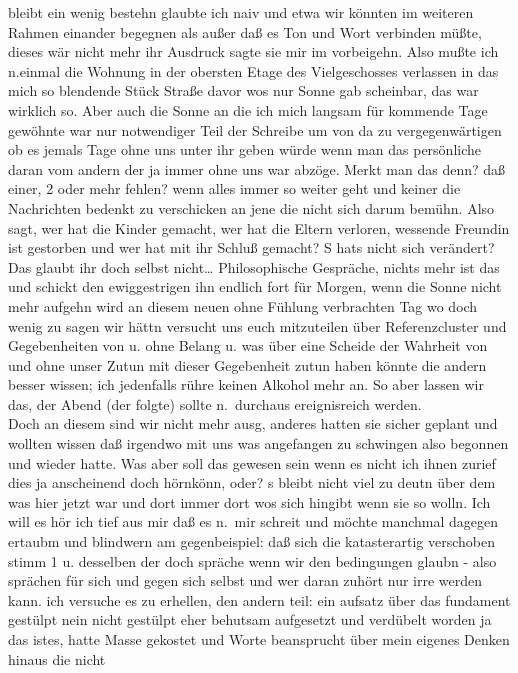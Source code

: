 \documentclass[
]{article}
\begin{document}
bleibt ein wenig bestehn glaubte ich naiv und etwa wir könnten im
weiteren Rahmen einander begegnen als außer daß es Ton und Wort
verbinden müßte, dieses wär nicht mehr ihr Ausdruck sagte sie mir im
vorbeigehn. Also mußte ich n.einmal die Wohnung in der obersten Etage
des Vielgeschosses verlassen in das mich so blendende Stück Straße davor
wos nur Sonne gab scheinbar, das war wirklich so. Aber auch die Sonne an
die ich mich langsam für kommende Tage gewöhnte war nur notwendiger Teil
der Schreibe um von da zu vergegenwärtigen ob es jemals Tage ohne uns
unter ihr geben würde wenn man das persönliche daran vom andern der ja
immer ohne uns war abzöge. Merkt man das denn? daß einer, 2 oder mehr
fehlen? wenn alles immer so weiter geht und keiner die Nachrichten
bedenkt zu verschicken an jene die nicht sich darum bemühn. Also sagt,
wer hat die Kinder gemacht, wer hat die Eltern verloren, wessende
Freundin ist gestorben und wer hat mit ihr Schluß gemacht?
\textquotesingle S hats nicht sich verändert? Das glaubt ihr doch selbst
nicht\ldots{} Philosophische Gespräche, nichts mehr ist das und schickt
den ewiggestrigen ihn endlich fort für Morgen, wenn die Sonne nicht mehr
aufgehn wird an diesem neuen ohne Fühlung verbrachten Tag wo doch wenig
zu sagen wir hättn versucht uns euch mitzuteilen über Referenzcluster
und Gegebenheiten von u. ohne Belang u. was über eine Scheide der
Wahrheit von und ohne unser Zutun mit dieser Gegebenheit zutun haben
könnte die andern besser wissen; ich jedenfalls rühre keinen Alkohol
mehr an. So aber lassen wir das, der Abend (der folgte) sollte
n.~durchaus ereignisreich werden.\\
Doch an diesem sind wir nicht mehr ausg, anderes hatten sie sicher
geplant und wollten wissen daß irgendwo mit uns was angefangen zu
schwingen also begonnen und wieder hatte. Was aber soll das gewesen sein
wenn es nicht ich ihnen zurief dies ja anscheinend doch hörnkönn, oder?
\textquotesingle s bleibt nicht viel zu deutn über dem was hier jetzt
war und dort immer dort wos sich hingibt wenn sie so wolln. Ich will es
hör ich tief aus mir daß es n.~mir schreit und möchte manchmal dagegen
ertaubm und blindwern am gegenbeispiel: daß sich die katasterartig
verschoben stimm 1 u. desselben der doch spräche wenn wir den
bedingungen glaubn - also sprächen für sich und gegen sich selbst und
wer daran zuhört nur irre werden kann. ich versuche es zu erhellen, den
andern teil: ein aufsatz über das fundament gestülpt nein nicht gestülpt
eher behutsam aufgesetzt und verdübelt worden ja das istes, hatte Masse
gekostet und Worte beansprucht über mein eigenes Denken hinaus die nicht
\end{document}
